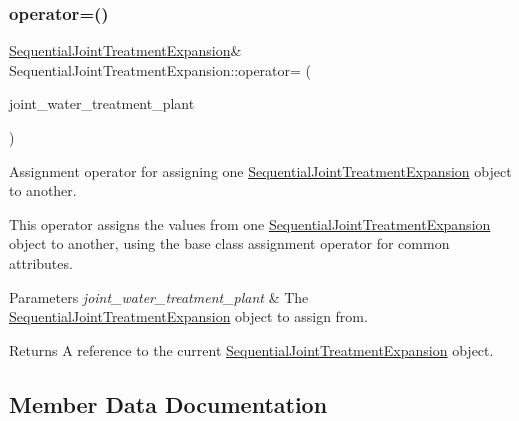 \subsubsection{\texorpdfstring{operator=()}{operator=()}}
{\footnotesize\ttfamily \mbox{\hyperlink{classSequentialJointTreatmentExpansion}{Sequential\+Joint\+Treatment\+Expansion}}\& Sequential\+Joint\+Treatment\+Expansion\+::operator= (\begin{DoxyParamCaption}\item[{const \mbox{\hyperlink{classSequentialJointTreatmentExpansion}{Sequential\+Joint\+Treatment\+Expansion}} \&}]{joint\+\_\+water\+\_\+treatment\+\_\+plant }\end{DoxyParamCaption})}



Assignment operator for assigning one \mbox{\hyperlink{classSequentialJointTreatmentExpansion}{Sequential\+Joint\+Treatment\+Expansion}} object to another. 

This operator assigns the values from one {\ttfamily \mbox{\hyperlink{classSequentialJointTreatmentExpansion}{Sequential\+Joint\+Treatment\+Expansion}}} object to another, using the base class assignment operator for common attributes.


\begin{DoxyParams}{Parameters}
{\em joint\+\_\+water\+\_\+treatment\+\_\+plant} & The {\ttfamily \mbox{\hyperlink{classSequentialJointTreatmentExpansion}{Sequential\+Joint\+Treatment\+Expansion}}} object to assign from.\\
\hline
\end{DoxyParams}
\begin{DoxyReturn}{Returns}
A reference to the current {\ttfamily \mbox{\hyperlink{classSequentialJointTreatmentExpansion}{Sequential\+Joint\+Treatment\+Expansion}}} object. 
\end{DoxyReturn}


\subsection{Member Data Documentation}
\mbox{\label{classSequentialJointTreatmentExpansion_a4c65188f0460e825e3595b9274141910}} 
